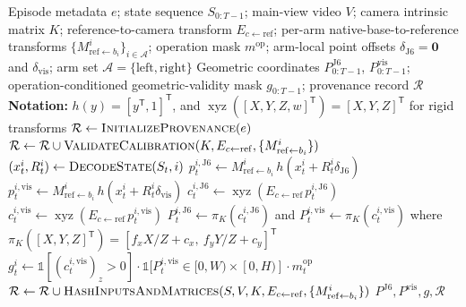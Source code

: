 
\begin{algorithm}[t]
\caption{Calibrated Main-View End-Effector Geometry}
\label{alg:calibrated-eef-geometry}
\begin{algorithmic}[1]
\Require Episode metadata $e$; state sequence $S_{0:T-1}$; main-view video
$V$; camera intrinsic matrix $K$; reference-to-camera transform
$E_{c\leftarrow\mathrm{ref}}$; per-arm native-base-to-reference transforms
$\{M^i_{\mathrm{ref}\leftarrow b_i}\}_{i\in\mathcal{A}}$; operation mask
$m^{\mathrm{op}}$; arm-local point offsets $\delta_{\mathrm{J6}}=\mathbf{0}$ and
$\delta_{\mathrm{vis}}$; arm set $\mathcal{A}=\{\mathrm{left},\mathrm{right}\}$
\Ensure Geometric coordinates $P^{\mathrm{J6}}_{0:T-1}$,
$P^{\mathrm{vis}}_{0:T-1}$; operation-conditioned geometric-validity mask
$g_{0:T-1}$; provenance record $\mathcal{R}$
\Statex \textbf{Notation:} $h(y)=[y^\mathsf{T},1]^\mathsf{T}$, and
$\operatorname{xyz}([X,Y,Z,w]^\mathsf{T})=[X,Y,Z]^\mathsf{T}$ for rigid transforms
\State $\mathcal{R}\gets\textsc{InitializeProvenance}(e)$
\State $\mathcal{R}\gets\mathcal{R}\cup
\textsc{ValidateCalibration}(K,E_{c\leftarrow\mathrm{ref}},
\{M^i_{\mathrm{ref}\leftarrow b_i}\})$
        \State $(x^i_t,R^i_t)\gets\textsc{DecodeState}(S_t,i)$
        \State $p^{i,\mathrm{J6}}_t\gets
        M^i_{\mathrm{ref}\leftarrow b_i}\,h(x^i_t+R^i_t\delta_{\mathrm{J6}})$
        \State $p^{i,\mathrm{vis}}_t\gets
        M^i_{\mathrm{ref}\leftarrow b_i}\,h(x^i_t+R^i_t\delta_{\mathrm{vis}})$
        \State $c^{i,\mathrm{J6}}_t\gets
        \operatorname{xyz}(E_{c\leftarrow\mathrm{ref}}\,p^{i,\mathrm{J6}}_t)$
        \State $c^{i,\mathrm{vis}}_t\gets
        \operatorname{xyz}(E_{c\leftarrow\mathrm{ref}}\,p^{i,\mathrm{vis}}_t)$
        \State $P^{i,\mathrm{J6}}_t\gets\pi_K(c^{i,\mathrm{J6}}_t)$ and
        $P^{i,\mathrm{vis}}_t\gets\pi_K(c^{i,\mathrm{vis}}_t)$
        \Statex \hspace{\algorithmicindent}where
        $\pi_K([X,Y,Z]^\mathsf{T})=[f_xX/Z+c_x,\ f_yY/Z+c_y]^\mathsf{T}$
        \State $g^i_t\gets\mathbb{1}[(c^{i,\mathrm{vis}}_t)_z>0]\cdot
        \mathbb{1}[P^{i,\mathrm{vis}}_t\in[0,W)\times[0,H)]\cdot m^{\mathrm{op}}_t$
    \EndFor
\EndFor
\State $\mathcal{R}\gets\mathcal{R}\cup
\textsc{HashInputsAndMatrices}(S,V,K,E_{c\leftarrow\mathrm{ref}},
\{M^i_{\mathrm{ref}\leftarrow b_i}\})$
\State \Return $P^{\mathrm{J6}},P^{\mathrm{vis}},g,\mathcal{R}$
\end{algorithmic}
\end{algorithm}

